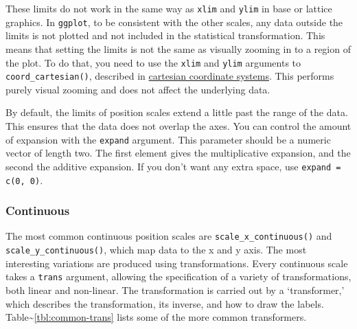 These limits do not work in the same way as \texttt{xlim} and
\texttt{ylim} in base or lattice graphics. In \texttt{ggplot}, to be
consistent with the other scales, any data outside the limits is not
plotted and not included in the statistical transformation. This means
that setting the limits is not the same as visually zooming in to a
region of the plot. To do that, you need to use the \texttt{xlim} and
\texttt{ylim} arguments to \texttt{coord\_cartesian()}, described in
\hyperref[sub:cartesian]{cartesian coordinate systems}. This performs
purely visual zooming and does not affect the underlying data.

By default, the limits of position scales extend a little past the range
of the data. This ensures that the data does not overlap the axes. You
can control the amount of expansion with the \texttt{expand} argument.
This parameter should be a numeric vector of length two. The first
element gives the multiplicative expansion, and the second the additive
expansion. If you don't want any extra space, use
\texttt{expand = c(0, 0)}. 

\subsubsection{Continuous}\label{ssub:scale-continuous}

The most common continuous position scales are
\texttt{scale\_x\_continuous()} and \texttt{scale\_y\_continuous()},
which map data to the x and y axis. 
The most interesting variations are produced using transformations.
Every continuous scale takes a \texttt{trans} argument, allowing the
specification of a variety of transformations, both linear and
non-linear. The transformation is carried out by a `transformer,' which
describes the transformation, its inverse, and how to draw the labels.
Table\textasciitilde{}\ref{tbl:common-trans} lists some of the more
common transformers. 
 

